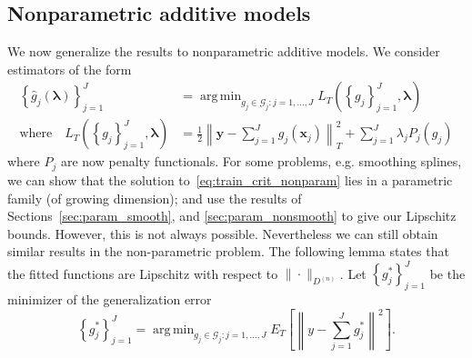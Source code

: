 \documentclass[12pt]{article} %
\theoremstyle{definition}
\DeclareMathOperator*{\argmin}{arg\,min}
\begin{document}
\subsection{Nonparametric additive models}
\label{sec:nonparam_smooth}

We now generalize the results to nonparametric additive models. We consider estimators of the form
\begin{align}
\label{eq:train_crit_nonparam}
\left\{ \hat{g}_j( \boldsymbol \lambda) \right \}_{j=1}^J &= 
\argmin_{g_j\in \mathcal{G}_j: j=1,...,J}  L_T\left (\left \{ g_j \right \}_{j=1}^J, \boldsymbol{\lambda} \right ) \\
\text{where} \quad L_T \left (\left \{ g_j \right \}_{j=1}^J, \boldsymbol{\lambda} \right ) &=
\frac{1}{2} \left \| \boldsymbol y -  \sum_{j=1}^J g_j(\boldsymbol x_j) \right \|^2_T 
+ \sum_{j=1}^J \lambda_j P_j(g_j)
\end{align}
where $P_j$ are now penalty functionals. For some problems, e.g. smoothing splines, we can show that the solution to~\eqref{eq:train_crit_nonparam} lies in a parametric family (of growing dimension); and use the results of Sections~\ref{sec:param_smooth}, and \ref{sec:param_nonsmooth} to give our Lipschitz bounds. However, this is not always possible. Nevertheless we can still obtain similar results in the non-parametric problem. The following lemma states that the fitted functions are Lipschitz with respect to $\| \cdot \|_{D^{(n)}}$. Let $\left\{ g_j^* \right \}_{j=1}^J$ be the minimizer of the generalization error
\begin{equation}
\left\{ g_j^* \right \}_{j=1}^J = \argmin_{g_j \in \mathcal{G}_j: j=1,...,J} E_T\left[ \left \| y - \sum_{j=1}^J g_j^* \right \|^2 \right].
\end{equation}
\end{document}

